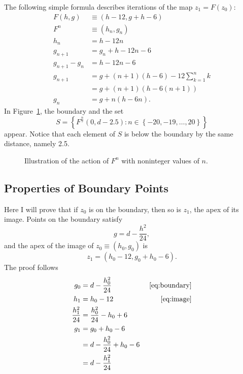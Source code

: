 \documentclass[twocolumn]{article}
\begin{document}
The following simple formula describes iterations of the map $z_1 =
F(z_0)$:
\begin{align*}
  F(h,g) &\equiv (h-12, g + h -6) \\
  F^n &\equiv (h_n, g_n) \\
  h_n &= h - 12 n \\
  g_{n+1} &= g_n + h - 12 n -6 \\
  g_{n+1} - g_n &= h - 12 n -6 \\
  g_{n+1} &= g + (n+1) (h-6) - 12\sum_{k=1}^n k \\
  &= g + (n+1)(h - 6(n+1)) \\
  g_n &= g + n(h - 6 n).
\end{align*}
In Figure~\ref{fig:f_n}, the boundary and the set
\begin{equation*}
S = \left\{ F^{\frac{n}{5}} (0,d-2.5) : n
    \in \left\{ -20, -19, \ldots , 20 \right\} \right\}  
\end{equation*}
appear.  Notice that each element of $S$ is below the boundary by the
same distance, namely 2.5.
\begin{figure}
  \centering
    \caption{Illustration of the action of $F^n$ with noninteger
      values of $n$.}
  \label{fig:f_n}
\end{figure}

\subsection{Properties of Boundary Points}
\label{sec:boundary}

Here I will prove that if $z_0$ is on the boundary, then so is $z_1$,
the apex of its image.  Points on the boundary satisfy
\begin{equation}
  \label{eq:boundary}
  g = d - \frac{h^2}{24},
\end{equation}
and the apex of the image of $z_0 \equiv (h_0,g_0)$ is
\begin{equation}
  \label{eq:image}
  z_1 = (h_0 -12, g_0 +h_0 -6).
\end{equation}
The proof follows
\begin{align}
  g_0 &= d - \frac{h_0^2}{24} & \text{ \eqref{eq:boundary}} \\
  h_1 &= h_0 -12 & \text{ \eqref{eq:image}} \\
  \frac{h_1^2}{24} &= \frac{h_0^2}{24} - h_0 +6 \\
  g_1 &= g_0 + h_0 -6 \\
  &= d - \frac{h_0^2}{24} + h_0 -6 \\
  &= d - \frac{h_1^2}{24} 
\end{align}
\end{document}
